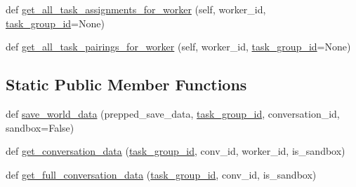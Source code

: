 \begin{DoxyCompactItemize}
\item 
def \hyperlink{classparlai_1_1mturk_1_1core_1_1dev_1_1mturk__data__handler_1_1MTurkDataHandler_a7d86983e9f01a1f785284bbda21a2860}{get\+\_\+all\+\_\+task\+\_\+assignments\+\_\+for\+\_\+worker} (self, worker\+\_\+id, \hyperlink{classparlai_1_1mturk_1_1core_1_1dev_1_1mturk__data__handler_1_1MTurkDataHandler_af4bebaca067ce2d388fe76ee8859e1bd}{task\+\_\+group\+\_\+id}=None)
\item 
def \hyperlink{classparlai_1_1mturk_1_1core_1_1dev_1_1mturk__data__handler_1_1MTurkDataHandler_a497bab989cb0979d44136b232a99f9a7}{get\+\_\+all\+\_\+task\+\_\+pairings\+\_\+for\+\_\+worker} (self, worker\+\_\+id, \hyperlink{classparlai_1_1mturk_1_1core_1_1dev_1_1mturk__data__handler_1_1MTurkDataHandler_af4bebaca067ce2d388fe76ee8859e1bd}{task\+\_\+group\+\_\+id}=None)
\end{DoxyCompactItemize}
\subsection*{Static Public Member Functions}
\begin{DoxyCompactItemize}
\item 
def \hyperlink{classparlai_1_1mturk_1_1core_1_1dev_1_1mturk__data__handler_1_1MTurkDataHandler_a6d5a47cdeede36a2fb650f28dd72ef12}{save\+\_\+world\+\_\+data} (prepped\+\_\+save\+\_\+data, \hyperlink{classparlai_1_1mturk_1_1core_1_1dev_1_1mturk__data__handler_1_1MTurkDataHandler_af4bebaca067ce2d388fe76ee8859e1bd}{task\+\_\+group\+\_\+id}, conversation\+\_\+id, sandbox=False)
\item 
def \hyperlink{classparlai_1_1mturk_1_1core_1_1dev_1_1mturk__data__handler_1_1MTurkDataHandler_af46969088769ed561fd4206e729aecf9}{get\+\_\+conversation\+\_\+data} (\hyperlink{classparlai_1_1mturk_1_1core_1_1dev_1_1mturk__data__handler_1_1MTurkDataHandler_af4bebaca067ce2d388fe76ee8859e1bd}{task\+\_\+group\+\_\+id}, conv\+\_\+id, worker\+\_\+id, is\+\_\+sandbox)
\item 
def \hyperlink{classparlai_1_1mturk_1_1core_1_1dev_1_1mturk__data__handler_1_1MTurkDataHandler_af089c1fdb7266ba77936d53d957932f4}{get\+\_\+full\+\_\+conversation\+\_\+data} (\hyperlink{classparlai_1_1mturk_1_1core_1_1dev_1_1mturk__data__handler_1_1MTurkDataHandler_af4bebaca067ce2d388fe76ee8859e1bd}{task\+\_\+group\+\_\+id}, conv\+\_\+id, is\+\_\+sandbox)
\end{DoxyCompactItemize}
